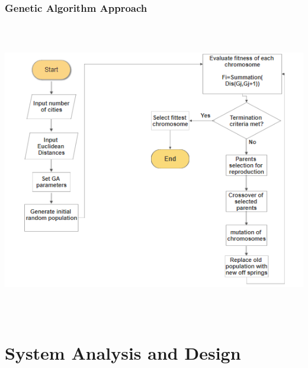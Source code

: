 \documentclass[12pt]{article}
\begin{document}
\subsubsection{ Genetic Algorithm Approach }
\begin{center}
	\includegraphics[width=17cm,height=13cm]{./assets/flowchart/ga.png}\\
\end{center}

\section{\sc System Analysis and Design}
\end{document}
